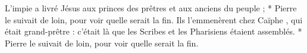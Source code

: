 L’impie a livré Jésus aux princes des prêtres et aux anciens du peuple ; * Pierre le suivait de loin, pour voir quelle serait la fin.
\versseparator
Ils l’emmenèrent chez Caïphe , qui était grand-prêtre : c’était là que les Scribes et les Pharisiens étaient assemblés. * Pierre le suivait de loin, pour voir quelle serait la fin.